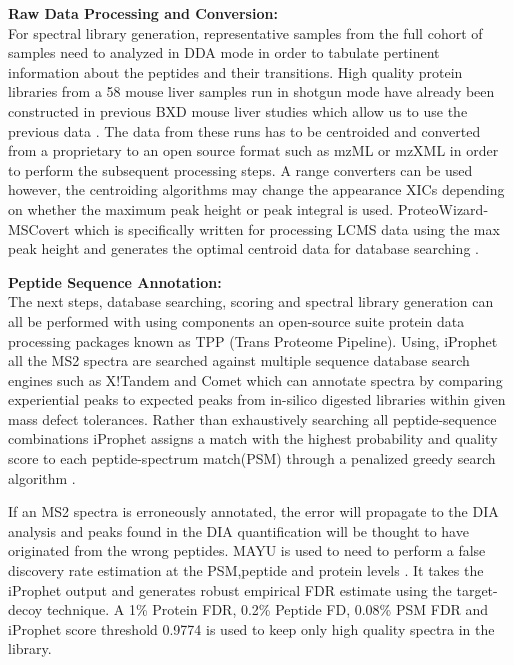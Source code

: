\documentclass[a4paper]{book}
\begin{document}
	\textbf{Raw Data Processing and Conversion:}\\
	For spectral library generation, representative samples from the full cohort of samples need to analyzed in DDA mode in order to tabulate pertinent information about the peptides and their transitions. High quality protein libraries from a 58 mouse liver samples run in shotgun mode have already been constructed in previous BXD mouse liver studies which allow us to use the previous data \citep{Williams2016SystemsFunction}. The data from these runs has to be centroided and converted from a proprietary to an open source format such as mzML or mzXML in order to perform the subsequent processing steps. A range converters can be used however, the centroiding algorithms may change the appearance XICs depending on whether the maximum peak height or peak integral is used. ProteoWizard-MSCovert which is specifically written for processing LCMS data using the max peak height and generates the optimal centroid data for database searching \citep{Kessner2008ProteoWizard:Development}. 
	
	\textbf{Peptide Sequence Annotation:}\\
	The next steps, database searching, scoring and spectral library generation can all be performed with using components an open-source suite protein data processing packages known as TPP (Trans Proteome Pipeline). Using, iProphet \citep{Shteynberg2011IProphet:Estimates.} all the MS2 spectra are searched against multiple sequence database search engines such as X!Tandem and Comet\citep{Eng2013Comettool} which can annotate spectra by comparing experiential peaks to expected peaks from in-silico digested libraries within given mass defect tolerances. Rather than exhaustively searching all peptide-sequence combinations iProphet assigns a match with the highest probability and quality score to each peptide-spectrum match(PSM) through a penalized greedy search algorithm \citep{Shteynberg2011IProphet:Estimates.}. 
	
	If an MS2 spectra is erroneously annotated, the error will propagate to the DIA analysis and peaks found in the DIA quantification will be thought to have originated from the wrong peptides. MAYU is used to need to perform a false discovery rate estimation at the PSM,peptide and protein levels \citep{Reiter2009ProteinSpectrometry}. It takes the iProphet output and generates robust empirical FDR estimate using the target-decoy technique\citep{Elias2007Target-decoySpectrometry}. A 1\% Protein FDR, 0.2\% Peptide FD, 0.08\% PSM FDR and iProphet score threshold 0.9774 is used to keep only high quality spectra in the library. 
	
\end{document}
